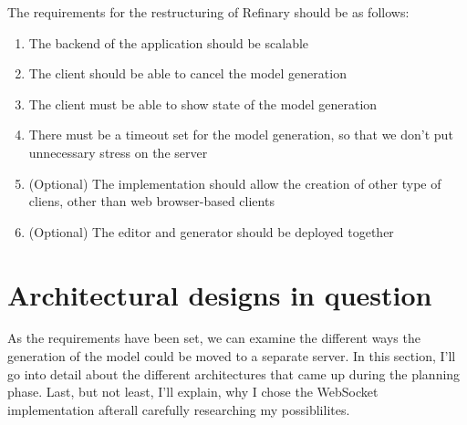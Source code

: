 The requirements for the restructuring of Refinary should be as follows:
\begin{enumerate}
        \item The backend of the application should be scalable 
        \item The client should be able to cancel the model generation
        \item The client must be able to show state of the model generation  
        \item There must be a timeout set for the model generation, so that we don't put unnecessary
		stress on the server
		\item (Optional) The implementation should allow the creation of other type of cliens,
		other than web browser-based clients
		\item (Optional) The editor and generator should be deployed together
\end{enumerate}

\section{Architectural designs in question}
As the requirements have been set, we can examine the different ways the generation of the model could be
moved to a separate server. In this section, I'll go into detail about the different architectures that came up during
the planning phase. Last, but not least, I'll explain, why I chose the WebSocket implementation afterall carefully researching
my possiblilites.


